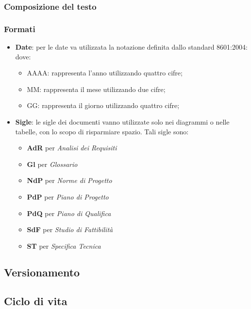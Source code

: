 		\subsubsection{Composizione del testo}
		\subsubsection{Formati}
		\begin{itemize}
			\item \textbf{Date}: per le date va utilizzata la notazione definita dallo standard  8601:2004:
			dove:
			\begin{itemize}
				\item AAAA: rappresenta l'anno utilizzando quattro cifre;
				\item MM: rappresenta il mese utilizzando due cifre;
				\item GG: rappresenta il giorno utilizzando quattro cifre;
			\end{itemize}
			\item \textbf{Sigle}: le sigle dei documenti vanno utilizzate solo nei diagrammi o nelle tabelle, con lo scopo di risparmiare spazio. Tali sigle sono:
			\begin{itemize}
				\item \textbf{AdR} per \textit{Analisi dei Requisiti}
				\item \textbf{Gl} per \textit{Glossario}
				\item \textbf{NdP} per \textit{Norme di Progetto}
				\item \textbf{PdP} per \textit{Piano di Progetto}
				\item \textbf{PdQ} per \textit{Piano di Qualifica}
				\item \textbf{SdF} per \textit{Studio di Fattibilità}
				\item \textbf{ST} per \textit{Specifica Tecnica}
			\end{itemize}	
		\end{itemize}
	\subsection{Versionamento}
	\subsection{Ciclo di vita}
